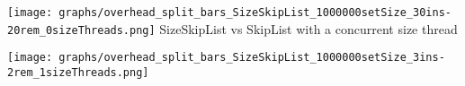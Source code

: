 \documentclass{article}
\begin{document}
\begin{figure*}
  \hspace*{0.5mm}
  \texttt{[image: graphs/overhead\_split\_bars\_SizeSkipList\_1000000setSize\_30ins-20rem\_0sizeThreads.png]}
  SizeSkipList vs SkipList with a concurrent size thread\par
  \vspace{2.2mm}
  \texttt{[image: graphs/overhead\_split\_bars\_SizeSkipList\_1000000setSize\_3ins-2rem\_1sizeThreads.png]}\hspace*{.05mm}
  \label{fig:overhead breakdown}
\end{figure*}
\end{document}
